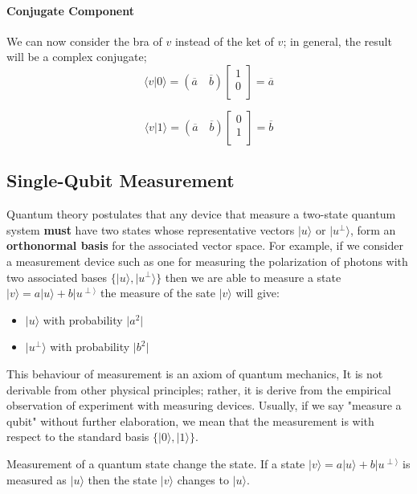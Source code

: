 \documentclass[12pt,a4paper]{report}
\begin{document}
\paragraph{Conjugate Component}
We can now consider the bra of $v$ instead of the ket of $v$; in general, the result will be a complex conjugate;
$$
\langle v | 0 \rangle
=
(\overline{a} \quad \overline{b})
\begin{bmatrix}
1 \\
0 \\
\end{bmatrix}
=
\overline{a}
$$

$$
\langle v | 1 \rangle
=
(\overline{a} \quad \overline{b})
\begin{bmatrix}
0 \\
1 \\
\end{bmatrix}
=
\overline{b}
$$

\subsection{Single-Qubit Measurement}
Quantum theory postulates that any device that measure a two-state quantum system \textbf{must} have two states whose representative vectors $ \vert u \rangle $ or $ \vert u^{\perp} \rangle $, form an \textbf{orthonormal basis} for the associated vector space.
For example, if we consider a measurement device such as one for measuring the polarization of photons with two associated bases
$ \lbrace \vert u \rangle, \vert u^{\perp} \rangle \rbrace $
then we are able to measure a state
$ \vert v \rangle = a \vert u \rangle + b \vert u^{\perp \rangle} $
the measure of the sate
$ \vert v \rangle $
will give:
\begin{itemize}
\item $ \vert u \rangle $ with probability $ \vert a^{2} \vert $
\item $ \vert u^{\bot} \rangle $ with probability $ \vert b^{2} \vert $
\end{itemize}
This behaviour of measurement is an axiom of quantum mechanics, It is not derivable from other physical principles; rather, it is derive from the empirical observation of experiment with measuring devices. Usually, if we say "measure a qubit" without further elaboration, we mean that the measurement is with respect to the standard basis
$ \lbrace | 0 \rangle, | 1 \rangle \rbrace $.

Measurement of a quantum state change the state. If a state
$ \vert v \rangle = a \vert u \rangle + b \vert u^{\perp \rangle} $
is measured as
$ \vert u \rangle $
then the state
$ \vert v \rangle $
changes to 
$ \vert u \rangle $.
\end{document}
